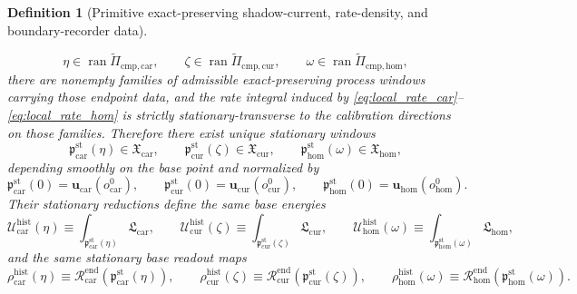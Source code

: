 \documentclass[11pt]{article}
\newcommand{\TensorEqCmpProj}{\widetilde\Pi_{\mathrm{cmp,car}}}
\newcommand{\CurEqCmpProj}{\widetilde\Pi_{\mathrm{cmp,cur}}}
\newcommand{\HomEqCmpProj}{\widetilde\Pi_{\mathrm{cmp,hom}}}
\newcommand{\TensorObjBase}{o_{\mathrm{car}}^0}
\newcommand{\CurObjBase}{o_{\mathrm{cur}}^0}
\newcommand{\HomObjBase}{o_{\mathrm{hom}}^0}
\newcommand{\TensorWindowClass}{\mathfrak X_{\mathrm{car}}}
\newcommand{\CurWindowClass}{\mathfrak X_{\mathrm{cur}}}
\newcommand{\HomWindowClass}{\mathfrak X_{\mathrm{hom}}}
\newcommand{\TensorLocalRate}{\mathfrak L_{\mathrm{car}}}
\newcommand{\CurLocalRate}{\mathfrak L_{\mathrm{cur}}}
\newcommand{\HomLocalRate}{\mathfrak L_{\mathrm{hom}}}
\newcommand{\TensorEndpointReadSeed}{\mathscr R_{\mathrm{car}}^{\mathrm{end}}}
\newcommand{\CurEndpointReadSeed}{\mathscr R_{\mathrm{cur}}^{\mathrm{end}}}
\newcommand{\HomEndpointReadSeed}{\mathscr R_{\mathrm{hom}}^{\mathrm{end}}}
\newcommand{\TensorStationaryWindow}{\mathfrak p_{\mathrm{car}}^{\mathrm{st}}}
\newcommand{\CurStationaryWindow}{\mathfrak p_{\mathrm{cur}}^{\mathrm{st}}}
\newcommand{\HomStationaryWindow}{\mathfrak p_{\mathrm{hom}}^{\mathrm{st}}}
\newtheorem{definition}{Definition}
\begin{document}
\begin{definition}[Primitive exact-preserving shadow-current, rate-density, and boundary-recorder data]
\begin{enumerate}
    \[
    \eta\in\operatorname{ran}\TensorEqCmpProj,\qquad
    \zeta\in\operatorname{ran}\CurEqCmpProj,\qquad
    \omega\in\operatorname{ran}\HomEqCmpProj,
    \]
    there are nonempty families of admissible exact-preserving process windows carrying those endpoint data, and the rate integral induced by \eqref{eq:local_rate_car}--\eqref{eq:local_rate_hom} is strictly stationary-transverse to the calibration directions on those families. Therefore there exist unique stationary windows
    \[
    \TensorStationaryWindow(\eta)\in\TensorWindowClass,\qquad
    \CurStationaryWindow(\zeta)\in\CurWindowClass,\qquad
    \HomStationaryWindow(\omega)\in\HomWindowClass,
    \]
    depending smoothly on the base point and normalized by
    \[
    \TensorStationaryWindow(0)=\mathbf u_{\mathrm{car}}(\TensorObjBase),\qquad
    \CurStationaryWindow(0)=\mathbf u_{\mathrm{cur}}(\CurObjBase),\qquad
    \HomStationaryWindow(0)=\mathbf u_{\mathrm{hom}}(\HomObjBase).
    \]
    Their stationary reductions define the same base energies
    \begin{equation}
    \mathcal U_{\mathrm{car}}^{\mathrm{hist}}(\eta)\equiv\int_{\TensorStationaryWindow(\eta)}\TensorLocalRate,\qquad
    \mathcal U_{\mathrm{cur}}^{\mathrm{hist}}(\zeta)\equiv\int_{\CurStationaryWindow(\zeta)}\CurLocalRate,\qquad
    \mathcal U_{\mathrm{hom}}^{\mathrm{hist}}(\omega)\equiv\int_{\HomStationaryWindow(\omega)}\HomLocalRate,
    \label{eq:base_energies}
    \end{equation}
    and the same stationary base readout maps
    \begin{equation}
    \rho_{\mathrm{car}}^{\mathrm{hist}}(\eta)\equiv\TensorEndpointReadSeed(\TensorStationaryWindow(\eta)),\qquad
    \rho_{\mathrm{cur}}^{\mathrm{hist}}(\zeta)\equiv\CurEndpointReadSeed(\CurStationaryWindow(\zeta)),\qquad
    \rho_{\mathrm{hom}}^{\mathrm{hist}}(\omega)\equiv\HomEndpointReadSeed(\HomStationaryWindow(\omega)).
    \label{eq:base_readouts}
    \end{equation}
\end{enumerate}
\end{definition}
\end{document}
